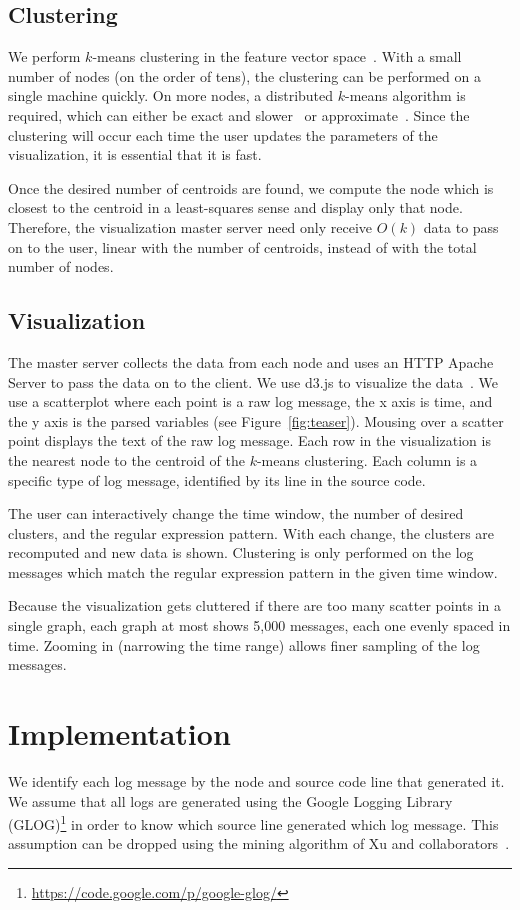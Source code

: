 \documentclass[conference]{style/acmsiggraph}
\begin{document}
\subsection{Clustering}
We perform $k$-means clustering in the feature vector space~\cite{kmeans,Lloyd82}.
With a small number of nodes (on the order of tens), the clustering can be performed on a single machine quickly.
On more nodes, a distributed $k$-means algorithm is required, which can either be exact and slower~\cite{jin2006fast} or approximate~\cite{kanungo2002local}.
Since the clustering will occur each time the user updates the parameters of the visualization, it is essential that it is fast.

Once the desired number of centroids are found, we compute the node which is closest to the centroid in a least-squares sense and display only that node.
Therefore, the visualization master server need only receive $O(k)$ data to pass on to the user, linear with the number of centroids, instead of with the total number of nodes.

\subsection{Visualization}
The master server collects the data from each node and uses an HTTP Apache Server to pass the data on to the client.
We use d3.js to visualize the data~\cite{D311}.
We use a scatterplot where each point is a raw log message, the x axis is time, and the y axis is the parsed variables (see Figure~\ref{fig:teaser}).
Mousing over a scatter point displays the text of the raw log message.
Each row in the visualization is the nearest node to the centroid of the $k$-means clustering.
Each column is a specific type of log message, identified by its line in the source code.

The user can interactively change the time window, the number of desired clusters, and the regular expression pattern. With each change, the clusters are recomputed and new data is shown. Clustering is only performed on the log messages which match the regular expression pattern in the given time window.

Because the visualization gets cluttered if there are too many scatter points in a single graph, each graph at most shows 5,000 messages, each one evenly spaced in time.
Zooming in (narrowing the time range) allows finer sampling of the log messages.


\section{Implementation}
We identify each log message by the node and source code line that generated it.
We assume that all logs are generated using the Google Logging Library (GLOG)\footnote{\url{https://code.google.com/p/google-glog/}} in order to know which source line generated which log message.
This assumption can be dropped using the mining algorithm of Xu and collaborators~\cite{XuOSP}.
\end{document}
